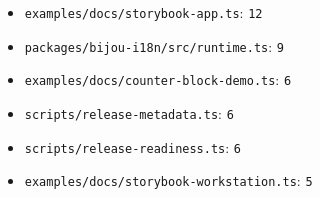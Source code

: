 \begin{itemize}
\tightlist
\item
  \texttt{e\allowbreak{}x\allowbreak{}a\allowbreak{}m\allowbreak{}p\allowbreak{}l\allowbreak{}e\allowbreak{}s\allowbreak{}/\allowbreak{}d\allowbreak{}o\allowbreak{}c\allowbreak{}s\allowbreak{}/\allowbreak{}s\allowbreak{}t\allowbreak{}o\allowbreak{}r\allowbreak{}y\allowbreak{}b\allowbreak{}o\allowbreak{}o\allowbreak{}k\allowbreak{}-\allowbreak{}a\allowbreak{}p\allowbreak{}p\allowbreak{}.\allowbreak{}t\allowbreak{}s}: \texttt{1\allowbreak{}2}
\item
  \texttt{p\allowbreak{}a\allowbreak{}c\allowbreak{}k\allowbreak{}a\allowbreak{}g\allowbreak{}e\allowbreak{}s\allowbreak{}/\allowbreak{}b\allowbreak{}i\allowbreak{}j\allowbreak{}o\allowbreak{}u\allowbreak{}-\allowbreak{}i\allowbreak{}1\allowbreak{}8\allowbreak{}n\allowbreak{}/\allowbreak{}s\allowbreak{}r\allowbreak{}c\allowbreak{}/\allowbreak{}r\allowbreak{}u\allowbreak{}n\allowbreak{}t\allowbreak{}i\allowbreak{}m\allowbreak{}e\allowbreak{}.\allowbreak{}t\allowbreak{}s}: \texttt{9}
\item
  \texttt{e\allowbreak{}x\allowbreak{}a\allowbreak{}m\allowbreak{}p\allowbreak{}l\allowbreak{}e\allowbreak{}s\allowbreak{}/\allowbreak{}d\allowbreak{}o\allowbreak{}c\allowbreak{}s\allowbreak{}/\allowbreak{}c\allowbreak{}o\allowbreak{}u\allowbreak{}n\allowbreak{}t\allowbreak{}e\allowbreak{}r\allowbreak{}-\allowbreak{}b\allowbreak{}l\allowbreak{}o\allowbreak{}c\allowbreak{}k\allowbreak{}-\allowbreak{}d\allowbreak{}e\allowbreak{}m\allowbreak{}o\allowbreak{}.\allowbreak{}t\allowbreak{}s}: \texttt{6}
\item
  \texttt{s\allowbreak{}c\allowbreak{}r\allowbreak{}i\allowbreak{}p\allowbreak{}t\allowbreak{}s\allowbreak{}/\allowbreak{}r\allowbreak{}e\allowbreak{}l\allowbreak{}e\allowbreak{}a\allowbreak{}s\allowbreak{}e\allowbreak{}-\allowbreak{}m\allowbreak{}e\allowbreak{}t\allowbreak{}a\allowbreak{}d\allowbreak{}a\allowbreak{}t\allowbreak{}a\allowbreak{}.\allowbreak{}t\allowbreak{}s}: \texttt{6}
\item
  \texttt{s\allowbreak{}c\allowbreak{}r\allowbreak{}i\allowbreak{}p\allowbreak{}t\allowbreak{}s\allowbreak{}/\allowbreak{}r\allowbreak{}e\allowbreak{}l\allowbreak{}e\allowbreak{}a\allowbreak{}s\allowbreak{}e\allowbreak{}-\allowbreak{}r\allowbreak{}e\allowbreak{}a\allowbreak{}d\allowbreak{}i\allowbreak{}n\allowbreak{}e\allowbreak{}s\allowbreak{}s\allowbreak{}.\allowbreak{}t\allowbreak{}s}: \texttt{6}
\item
  \texttt{e\allowbreak{}x\allowbreak{}a\allowbreak{}m\allowbreak{}p\allowbreak{}l\allowbreak{}e\allowbreak{}s\allowbreak{}/\allowbreak{}d\allowbreak{}o\allowbreak{}c\allowbreak{}s\allowbreak{}/\allowbreak{}s\allowbreak{}t\allowbreak{}o\allowbreak{}r\allowbreak{}y\allowbreak{}b\allowbreak{}o\allowbreak{}o\allowbreak{}k\allowbreak{}-\allowbreak{}w\allowbreak{}o\allowbreak{}r\allowbreak{}k\allowbreak{}s\allowbreak{}t\allowbreak{}a\allowbreak{}t\allowbreak{}i\allowbreak{}o\allowbreak{}n\allowbreak{}.\allowbreak{}t\allowbreak{}s}: \texttt{5}

\end{itemize}
